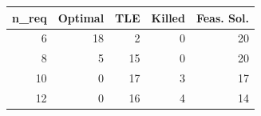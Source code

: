
\begin{tabular}{rrrrr}
\toprule
n\_req & Optimal & TLE & Killed & Feas. Sol.\\
\midrule
6 & 18 & 2 & 0 & 20\\
8 & 5 & 15 & 0 & 20\\
10 & 0 & 17 & 3 & 17\\
12 & 0 & 16 & 4 & 14\\
\bottomrule
\end{tabular}
